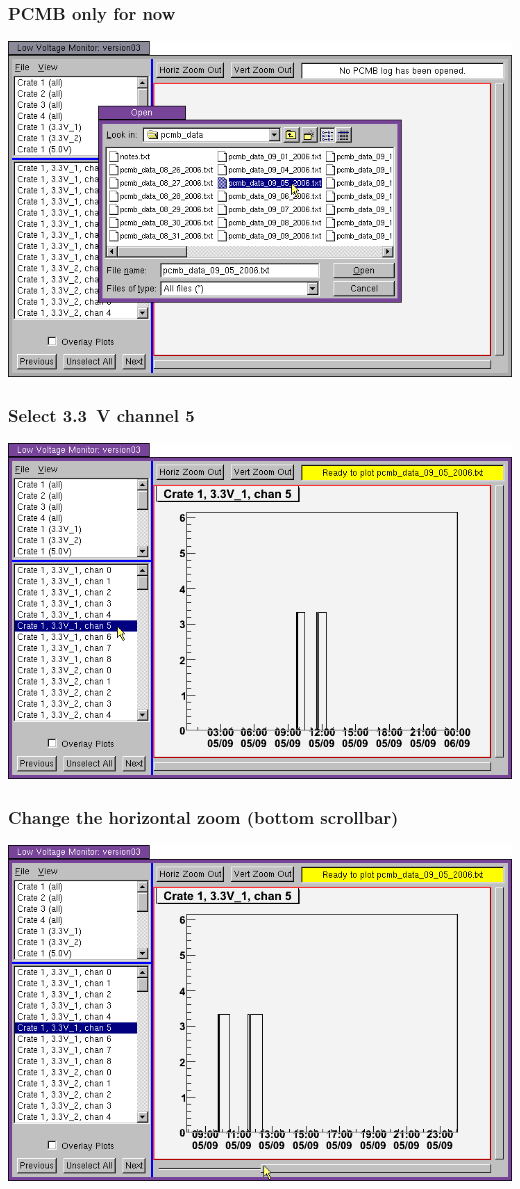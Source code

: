 \documentclass[12pt,compress]{beamer}
\begin{document}
\begin{frame}
\frametitle{PCMB only for now}
\begin{center}
\includegraphics[width=0.9\linewidth]{03.png}
\end{center}
\end{frame}

\begin{frame}
\frametitle{Select 3.3~V channel 5}
\begin{center}
\includegraphics[width=0.9\linewidth]{04.png}
\end{center}
\end{frame}

\begin{frame}
\frametitle{Change the horizontal zoom (bottom scrollbar)}
\begin{center}
\includegraphics[width=0.9\linewidth]{05.png}
\end{center}
\end{frame}
\end{document}
